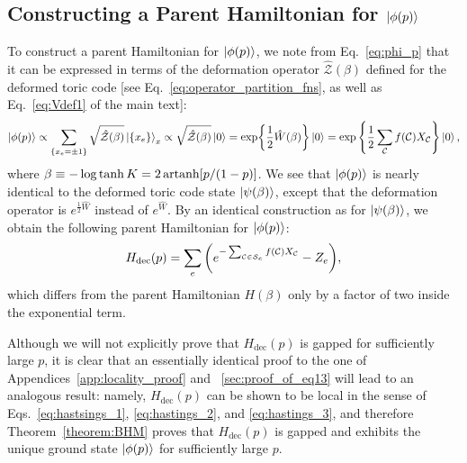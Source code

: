 \subsection{Constructing a Parent Hamiltonian for \texorpdfstring{$\ket{\phi(p)}$}{phi_p}}
To construct a parent Hamiltonian for $\ket{\phi(p)}$, we note from Eq.~\eqref{eq:phi_p} that it can be expressed in terms of the deformation operator $\hat{\mathcal{Z}}(\beta)$ defined for the deformed toric code [see Eq.~\eqref{eq:operator_partition_fns}, as well as Eq.~\eqref{eq:Vdef1} of the main text]:
\begin{equation}
    \ket{\phi(p)} \propto \sum_{\qty{x_e = \pm 1}} \sqrt{ \hat{\mathcal{Z}}(\beta) } \ket{\qty{x_e}}_x \propto \sqrt{\hat{\mathcal{Z}}(\beta)} \ket{0} = \exp{ \frac{1}{2} \hat{W}(\beta) } \ket{0} = \exp \qty{ \frac{1}{2} \sum_{\mathcal{C}} f(\mathcal{C}) X_{\mathcal{C}} } \ket{0} ,
\end{equation}
where $\beta \equiv - \log \tanh K = 2 \operatorname{artanh}[p/(1-p)]$. We see that $\ket{\phi(p)}$ is nearly identical to the deformed toric code state $\ket{\psi(\beta)}$, except that the deformation operator is $e^{\frac{1}{2} \hat{W}}$ instead of $e^{\hat{W}}$. By an identical construction as for $\ket{\psi(\beta)}$, we obtain the following parent Hamiltonian for $\ket{\phi(p)}$:
\begin{equation}
    H_{\text{dec}}(p) = \sum_e \qty( e^{- \sum_{\mathcal{C} \in \mathcal{S}_e} f(\mathcal{C}) X_{\mathcal{C}}} - Z_e ) ,
\end{equation}
which differs from the parent Hamiltonian $H(\beta)$ only by a factor of two inside the exponential term.

Although we will not explicitly prove that $H_{\text{dec}}(p)$ is gapped for sufficiently large $p$, it is clear that an essentially identical proof to the one of Appendices~\ref{app:locality_proof} and ~\ref{sec:proof_of_eq13} will lead to an analogous result: namely, $H_{\text{dec}}(p)$ can be shown to be local in the sense of Eqs.~\eqref{eq:hastsings_1}, \eqref{eq:hastings_2}, and \eqref{eq:hastings_3}, and therefore Theorem~\ref{theorem:BHM} proves that $H_{\text{dec}}(p)$ is gapped and exhibits the unique ground state $\ket{\phi(p)}$ for sufficiently large $p$. 


